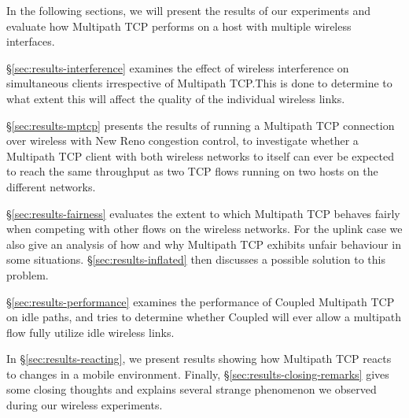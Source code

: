 In the following sections, we will present the results of our experiments and
evaluate how Multipath TCP performs on a host with multiple wireless
interfaces.

\S\ref{sec:results-interference} examines the effect of wireless
interference on simultaneous clients irrespective of Multipath TCP.\@ This is
done to determine to what extent this will affect the quality of the individual
wireless links.

\S\ref{sec:results-mptcp} presents the results of running a Multipath TCP
connection over wireless with New Reno congestion control, to investigate whether
a Multipath TCP client with both wireless networks to
itself can ever be expected to reach the same throughput as two TCP flows running on two hosts
on the different networks.

\S\ref{sec:results-fairness} evaluates the extent to which Multipath TCP behaves
fairly when competing with other flows on the wireless networks. For the uplink
case we also give an analysis of how and why Multipath TCP exhibits unfair
behaviour in some situations. \S\ref{sec:results-inflated} then discusses a
possible solution to this problem.

\S\ref{sec:results-performance} examines the performance of Coupled Multipath
TCP on idle paths, and tries to determine whether Coupled will ever allow a
multipath flow fully utilize idle wireless links.

In \S\ref{sec:results-reacting}, we present results showing how Multipath TCP
reacts to changes in a mobile environment. Finally,
\S\ref{sec:results-closing-remarks} gives some closing thoughts and explains
several strange phenomenon we observed during our wireless experiments.
